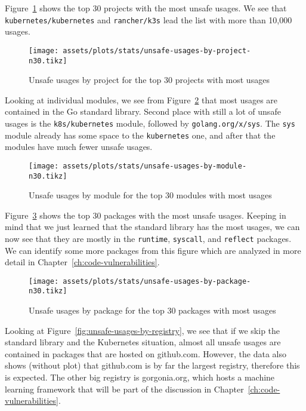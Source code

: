 Figure~\ref{fig:unsafe-usages-by-project-n30} shows the top 30 projects with the most unsafe usages.
We see that \texttt{kubernetes/kubernetes} and \texttt{rancher/k3s} lead the list with more than 10,000 usages.

\begin{figure}[ht]
    \centering
    {\scriptsize \texttt{[image: assets/plots/stats/unsafe-usages-by-project-n30.tikz]}}
    \caption{Unsafe usages by project for the top 30 projects with most usages}
    \label{fig:unsafe-usages-by-project-n30}
\end{figure}

Looking at individual modules, we see from Figure~\ref{fig:unsafe-usages-by-module-n30} that most usages are contained
in the Go standard library.
Second place with still a lot of unsafe usages is the \texttt{k8s/kubernetes} module, followed by
\texttt{golang.org/x/sys}.
The \texttt{sys} module already has some space to the \texttt{kubernetes} one, and after that the modules have much
fewer unsafe usages.

\begin{figure}[ht]
    \centering
    {\scriptsize \texttt{[image: assets/plots/stats/unsafe-usages-by-module-n30.tikz]}}
    \caption{Unsafe usages by module for the top 30 modules with most usages}
    \label{fig:unsafe-usages-by-module-n30}
\end{figure}

Figure~\ref{fig:unsafe-usages-by-package-n30} shows the top 30 packages with the most unsafe usages.
Keeping in mind that we just learned that the standard library has the most usages, we can now see that they are mostly
in the \texttt{runtime}, \texttt{syscall}, and \texttt{reflect} packages.
We can identify some more packages from this figure which are analyzed in more detail in Chapter~\ref{ch:code-vulnerabilities}.

\begin{figure}[ht]
    \centering
    {\scriptsize \texttt{[image: assets/plots/stats/unsafe-usages-by-package-n30.tikz]}}
    \caption{Unsafe usages by package for the top 30 packages with most usages}
    \label{fig:unsafe-usages-by-package-n30}
\end{figure}

Looking at Figure~\ref{fig:unsafe-usages-by-registry}, we see that if we skip the standard library and the Kubernetes
situation, almost all unsafe usages are contained in packages that are hosted on github.com.
However, the data also shows (without plot) that github.com is by far the largest registry, therefore this is expected.
The other big registry is gorgonia.org, which hosts a machine learning framework that will be part of the discussion in
Chapter~\ref{ch:code-vulnerabilities}.

